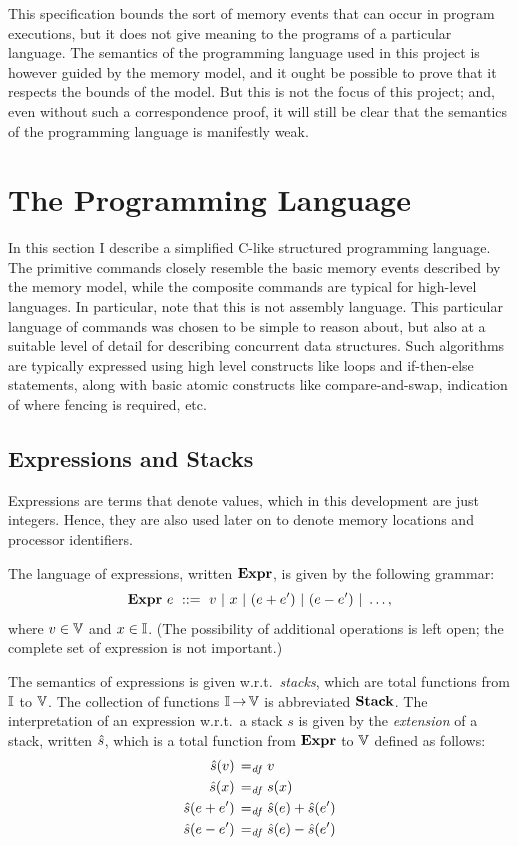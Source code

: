 \documentclass[11pt]{article}
\begin{document}
This specification bounds the sort of memory events that can occur in program executions, but it does not give meaning to the programs of a particular language. The semantics of the programming language used in this project is however guided by the memory model, and it ought be possible to prove that it respects the bounds of the model. But this is not the focus of this project; and, even without such a correspondence proof, it will still be clear that the semantics of the programming language is manifestly weak. 

\section{The Programming Language}
\label{sec:programming-language}

In this section I describe a simplified C-like structured programming language. The primitive commands closely resemble the basic memory events described by the memory model, while the composite commands are typical for high-level languages. In particular, note that this is not assembly language. This particular language of commands was chosen to be simple to reason about, but also at a suitable level of detail for describing concurrent data structures. Such algorithms are typically expressed using high level constructs like loops and if-then-else statements, along with basic atomic constructs like compare-and-swap, indication of where fencing is required, etc. 

\subsection{Expressions and Stacks}
\label{sec:expressions}

Expressions are terms that denote values, which in this development are just integers. Hence, they are also used later on to denote memory locations and processor identifiers. 

The language of expressions, written $\mathbf{Expr}$, is given by the following grammar: \[ \mathbf{Expr}~e ~::=~ v ~|~ x ~|~ (e + e') ~|~ (e - e') ~|~ \ldots, \] where $v \in \mathbb{V}$ and $x \in \mathbb{I}$. (The possibility of additional operations is left open; the complete set of expression is not important.)

The semantics of expressions is given w.r.t.~\emph{stacks}, which are total functions from $\mathbb{I}$ to $\mathbb{V}$. The collection of functions $\mathbb{I} \operatorname{\rightarrow} \mathbb{V}$ is abbreviated $\mathbf{Stack}$. The interpretation of an expression w.r.t.~a stack $s$ is given by the \emph{extension} of a stack, written $\hat{s}$, which is a total function from $\mathbf{Expr}$ to $\mathbb{V}$ defined as follows: \begin{align*}
	\hat{s}(v) \operatorname{\;=_{\mathit{df}}\;} & v \\
	\hat{s}(x) \operatorname{\;=_{\mathit{df}}\;} & s(x) \\
	\hat{s}(e + e') \operatorname{\;=_{\mathit{df}}\;} & \hat{s}(e) + \hat{s}(e') \\
	\hat{s}(e - e') \operatorname{\;=_{\mathit{df}}\;} & \hat{s}(e) - \hat{s}(e')
\end{align*}  
\end{document}

